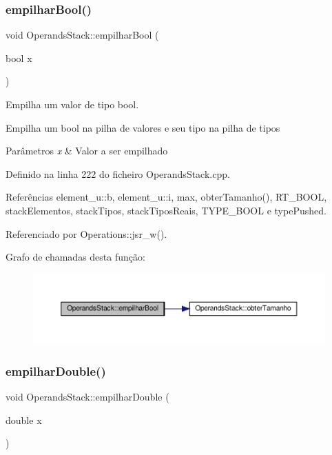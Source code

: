 \subsubsection{\texorpdfstring{empilhar\+Bool()}{empilharBool()}}
{\footnotesize\ttfamily void Operands\+Stack\+::empilhar\+Bool (\begin{DoxyParamCaption}\item[{bool}]{x }\end{DoxyParamCaption})}



Empilha um valor de tipo bool. 

Empilha um bool na pilha de valores e seu tipo na pilha de tipos


\begin{DoxyParams}{Parâmetros}
{\em x} & Valor a ser empilhado \\
\hline
\end{DoxyParams}


Definido na linha 222 do ficheiro Operands\+Stack.\+cpp.



Referências element\+\_\+u\+::b, element\+\_\+u\+::i, max, obter\+Tamanho(), R\+T\+\_\+\+B\+O\+OL, stack\+Elementos, stack\+Tipos, stack\+Tipos\+Reais, T\+Y\+P\+E\+\_\+\+B\+O\+OL e type\+Pushed.



Referenciado por Operations\+::jsr\+\_\+w().

Grafo de chamadas desta função\+:\nopagebreak
\begin{figure}[H]
\begin{center}
\leavevmode
\includegraphics[width=350pt]{classOperandsStack_aca2be3100b76689949f029196a893712_cgraph}
\end{center}
\end{figure}
\mbox{\label{classOperandsStack_a45dde91cc54ad980d1cbb7cdb1e084cd}} 
\subsubsection{\texorpdfstring{empilhar\+Double()}{empilharDouble()}}
{\footnotesize\ttfamily void Operands\+Stack\+::empilhar\+Double (\begin{DoxyParamCaption}\item[{double}]{x }\end{DoxyParamCaption})}



